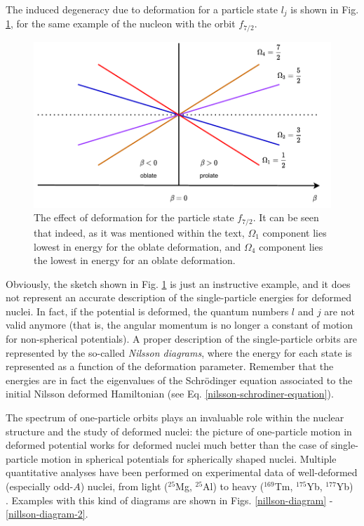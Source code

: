 The induced degeneracy due to deformation for a particle state $l_j$ is shown in Fig. \ref{nillson-orbits-splittings}, for the same example of the nucleon with the orbit $f_{7/2}$.

\begin{figure}
    \centering
    \includegraphics[scale=0.95]{Chapters/Figures/nillson_SP_splittings.pdf}
    \caption{The effect of deformation for the particle state $f_{7/2}$. It can be seen that indeed, as it was mentioned within the text, $\Omega_1$ component lies lowest in energy for the oblate deformation, and $\Omega_4$ component lies the lowest in energy for an oblate deformation.}
    \label{nillson-orbits-splittings}
\end{figure}

Obviously, the sketch shown in Fig. \ref{nillson-orbits-splittings} is just an instructive example, and it does not represent an accurate description of the single-particle energies for deformed nuclei. In fact, if the potential is deformed, the quantum numbers $l$ and $j$ are not valid anymore (that is, the angular momentum is no longer a constant of motion for non-spherical potentials). A proper description of the single-particle orbits are represented by the so-called \emph{Nilsson diagrams}, where the energy for each state is represented as a function of the deformation parameter. Remember that the energies are in fact the eigenvalues of the Schrödinger equation associated to the initial Nilsson deformed Hamiltonian (see Eq. \ref{nilsson-schrodiner-equation}).

The spectrum of one-particle orbits plays an invaluable role within the nuclear structure and the study of deformed nuclei: the picture of one-particle motion in deformed potential works for deformed nuclei much better than the case of single-particle motion in spherical potentials for spherically shaped nuclei. Multiple quantitative analyses have been performed on experimental data of well-deformed (especially odd-$A$) nuclei, from light ($^{25}$Mg, $^{25}$Al) to heavy ($^{169}$Tm, $^{175}$Yb, $^{177}$Yb) \cite{hamamoto2016interplay}. Examples with this kind of diagrams are shown in Figs. \ref{nillson-diagram} - \ref{nillson-diagram-2}. 


